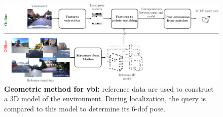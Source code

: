 \begin{figure}[t]
	\centering

	\includegraphics[width=\linewidth]{methods/geometric_method}
	\caption[Geometric method]{\label{fig:geometric_method}\textbf{Geometric method for \acs{vbl}:} reference data are used to construct a 3D model of the environment. During localization, the query is compared to this model to determine its 6-\ac{dof} pose.}
\end{figure}
